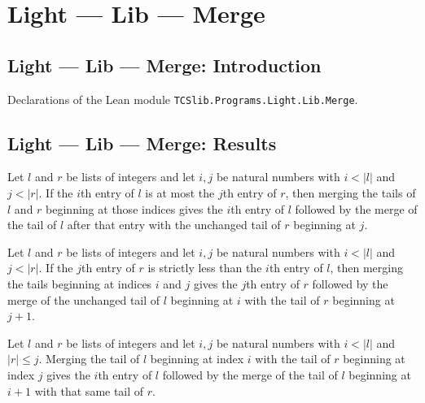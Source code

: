 \section{Light --- Lib --- Merge}
\subsection*{Light --- Lib --- Merge: Introduction}

Declarations of the Lean module \texttt{TCSlib.Programs.Light.Lib.Merge}.

\subsection*{Light --- Lib --- Merge: Results}

\begin{theorem}
\label{Light.Merge.step_left}
\leanok
{}
Let $l$ and $r$ be lists of integers and let $i,j$ be natural numbers with $i<|l|$ and
$j<|r|$. If the $i$th entry of $l$ is at most the $j$th entry of $r$, then merging the
tails of $l$ and $r$ beginning at those indices gives the $i$th entry of $l$ followed by
the merge of the tail of $l$ after that entry with the unchanged tail of $r$ beginning
at $j$.
\end{theorem}

\begin{theorem}
\label{Light.Merge.step_right}
\leanok
{}
Let $l$ and $r$ be lists of integers and let $i,j$ be natural numbers with $i<|l|$ and
$j<|r|$. If the $j$th entry of $r$ is strictly less than the $i$th entry of $l$, then
merging the tails beginning at indices $i$ and $j$ gives the $j$th entry of $r$ followed
by the merge of the unchanged tail of $l$ beginning at $i$ with the tail of $r$
beginning at $j+1$.
\end{theorem}

\begin{theorem}
\label{Light.Merge.step_left_end}
\leanok
{}
Let $l$ and $r$ be lists of integers and let $i,j$ be natural numbers with $i<|l|$ and
$|r|\le j$. Merging the tail of $l$ beginning at index $i$ with the tail of $r$
beginning at index $j$ gives the $i$th entry of $l$ followed by the merge of the tail of
$l$ beginning at $i+1$ with that same tail of $r$.
\end{theorem}

